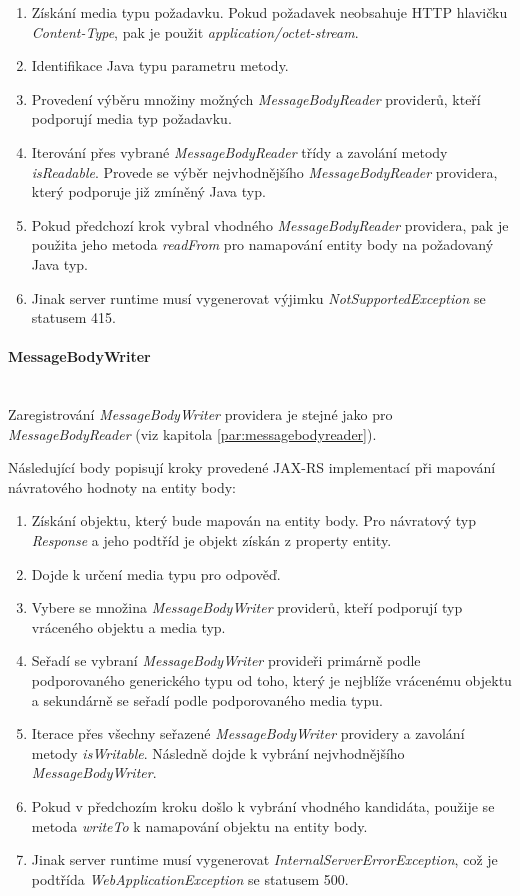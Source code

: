 \documentclass[11pt,twoside,a4paper]{book}
\begin{document}
\begin{enumerate}
  \item Získání media typu požadavku. Pokud požadavek neobsahuje HTTP hlavičku
{\em Content-Type}, pak je použit {\em application/octet-stream}.
  \item Identifikace Java typu parametru metody.
  \item Provedení výběru množiny možných {\em MessageBodyReader} providerů,
  kteří podporují media typ požadavku.
  \item Iterování přes vybrané {\em MessageBodyReader} třídy a zavolání metody
  {\em isReadable}.
Provede se výběr nejvhodnějšího {\em MessageBodyReader} providera, který
podporuje již zmíněný Java typ.
  \item Pokud předchozí krok vybral vhodného {\em MessageBodyReader} providera,
  pak je použita jeho metoda {\em readFrom} pro namapování entity body na
  požadovaný Java typ.
  \item Jinak server runtime musí vygenerovat výjimku {\em
  NotSupportedException} se statusem 415.
\end{enumerate}

\paragraph{MessageBodyWriter}
\mbox{}\\

Zaregistrování {\em MessageBodyWriter} providera je stejné jako pro
{\em MessageBodyReader} (viz kapitola \ref{par:messagebodyreader}).

Následující body popisují kroky provedené JAX-RS implementací při mapování
návratového hodnoty na entity body:

\begin{enumerate}
  \item Získání objektu, který bude mapován na entity body. Pro návratový typ {\em Response} a
jeho podtříd je objekt získán z property entity.
  \item Dojde k určení media typu pro odpověď.
  \item Vybere se množina {\em MessageBodyWriter} providerů, kteří podporují typ
  vráceného objektu a media typ.
  \item Seřadí se vybraní {\em MessageBodyWriter} provideři primárně podle
  podporovaného generického typu od toho, který je nejblíže vrácenému objektu a sekundárně se seřadí
podle podporovaného media typu.
  \item Iterace přes všechny seřazené {\em MessageBodyWriter} providery a
  zavolání metody {\em isWritable}. Následně dojde k vybrání nejvhodnějšího
  {\em MessageBodyWriter}.
  \item Pokud v předchozím kroku došlo k vybrání vhodného kandidáta, použije se
metoda {\em writeTo} k namapování objektu na entity body.
  \item Jinak server runtime musí vygenerovat {\em
  InternalServerErrorException}, což je podtřída {\em WebApplicationException}
  se statusem 500.
\end{enumerate}
\end{document}
